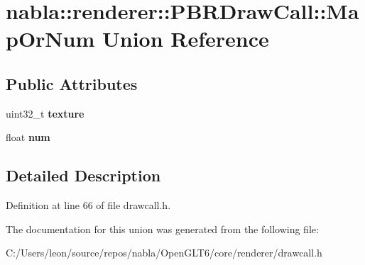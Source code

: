 \hypertarget{unionnabla_1_1renderer_1_1_p_b_r_draw_call_1_1_map_or_num}{}\section{nabla\+::renderer\+::P\+B\+R\+Draw\+Call\+::Map\+Or\+Num Union Reference}
\label{unionnabla_1_1renderer_1_1_p_b_r_draw_call_1_1_map_or_num}
\subsection*{Public Attributes}
\begin{DoxyCompactItemize}
\item 
\mbox{\label{unionnabla_1_1renderer_1_1_p_b_r_draw_call_1_1_map_or_num_ad8d1b7a61bf20be15f8a8a68119e3469}} 
uint32\+\_\+t {\bfseries texture}
\item 
\mbox{\label{unionnabla_1_1renderer_1_1_p_b_r_draw_call_1_1_map_or_num_ae9fc6139d127c489c73b71019dede2a1}} 
float {\bfseries num}
\end{DoxyCompactItemize}


\subsection{Detailed Description}


Definition at line 66 of file drawcall.\+h.



The documentation for this union was generated from the following file\+:\begin{DoxyCompactItemize}
\item 
C\+:/\+Users/leon/source/repos/nabla/\+Open\+G\+L\+T6/core/renderer/drawcall.\+h\end{DoxyCompactItemize}
